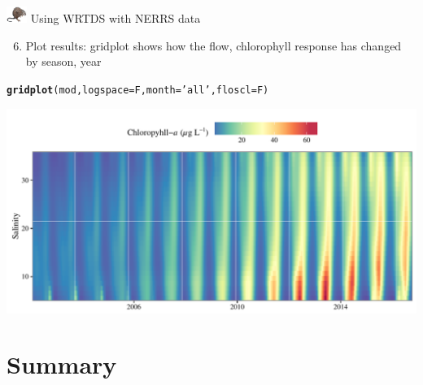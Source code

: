 \documentclass[xcolor=dvipsnames,serif]{beamer}\usepackage[]{graphicx}\usepackage[]{color}
\makeatletter
\def\maxwidth{ %
  \ifdim\Gin@nat@width>\linewidth
    \linewidth
  \else
    \Gin@nat@width
  \fi
}
\newcommand{\hlstr}[1]{\textcolor[rgb]{0.192,0.494,0.8}{#1}}%
\newcommand{\hlstd}[1]{\textcolor[rgb]{0.345,0.345,0.345}{#1}}%
\newcommand{\hlkwc}[1]{\textcolor[rgb]{0.333,0.667,0.333}{#1}}%
\newcommand{\hlkwd}[1]{\textcolor[rgb]{0.737,0.353,0.396}{\textbf{#1}}}%
\newenvironment{kframe}{%
 \def\at@end@of@kframe{}%
 \ifinner\ifhmode%
  \def\at@end@of@kframe{\end{minipage}}%
  \begin{minipage}{\columnwidth}%
 \fi\fi%
 \def\FrameCommand##1{\hskip\@totalleftmargin \hskip-\fboxsep
 \colorbox{shadecolor}{##1}\hskip-\fboxsep
     \hskip-\linewidth \hskip-\@totalleftmargin \hskip\columnwidth}%
 \MakeFramed {\advance\hsize-\width
   \@totalleftmargin\z@ \linewidth\hsize
   \@setminipage}}%
 {\par\unskip\endMakeFramed%
 \at@end@of@kframe}
\newenvironment{knitrout}{}{} %
\makeatother
\begin{document}
\begin{frame}[t, fragile]{\includegraphics[width = 0.05\textwidth]{imgs/swmprat.png} Using WRTDS with NERRS data}{}
\begin{enumerate}
\setcounter{enumi}{5}
\item Plot results: gridplot shows how the flow, chlorophyll response has changed by season, year
\end{enumerate}
\begin{knitrout}\scriptsize
{}\color{fgcolor}\begin{kframe}
\begin{alltt}
\hlkwd{gridplot}\hlstd{(mod,} \hlkwc{logspace} \hlstd{= F,} \hlkwc{month} \hlstd{=} \hlstr{'all'}\hlstd{,} \hlkwc{floscl} \hlstd{= F)}
\end{alltt}
\end{kframe}

{\centering \includegraphics[width=\maxwidth]{imgs/wrtdsplo3-1} 

}



\end{knitrout}
\end{frame}

\section{Summary}
\end{document}
